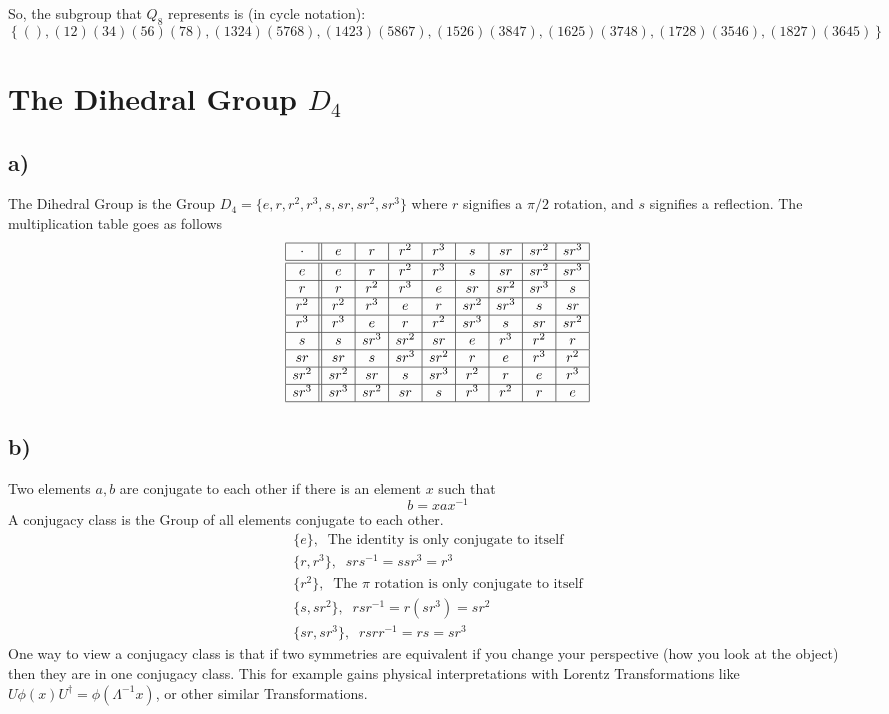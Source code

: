 \documentclass[]{scrartcl}
\begin{document}
So, the subgroup that $Q_8$ represents is (in cycle notation):
$$
\left\{(), (12)(34)(56)(78), (1324)(5768), (1423)(5867), (1526)(3847), (1625)(3748), (1728)(3546), (1827)(3645)\right\}
$$

\section{The Dihedral Group $D_4$}

\subsection{a)}
The Dihedral Group is the Group $D_4 = \{e,r,r^2,r^3,s,sr,sr^2,sr^3\}$ where $r$ signifies a $\pi/2$ rotation, and $s$ signifies a reflection. The multiplication table goes as follows
$$
\begin{array}{|c||c|c|c|c|c|c|c|c|}\hline
    \cdot & e & r & r^2 & r^3 & s & sr & sr^2 & sr^3 \\
    \hline\hline
    e & e & r & r^2 & r^3 & s & sr & sr^2 & sr^3 \\\hline
    r & r & r^2 & r^3 & e & sr & sr^2 & sr^3 & s \\\hline
    r^2 & r^2 & r^3 & e & r & sr^2 & sr^3 & s & sr \\\hline
    r^3 & r^3 & e & r & r^2 & sr^3 & s & sr & sr^2 \\\hline
    s & s & sr^3 & sr^2 & sr & e & r^3 & r^2 & r \\\hline
    sr & sr & s & sr^3 & sr^2 & r & e & r^3 & r^2 \\\hline
    sr^2 & sr^2 & sr & s & sr^3 & r^2 & r & e & r^3 \\\hline
    sr^3 & sr^3 & sr^2 & sr & s & r^3 & r^2 & r & e \\\hline
\end{array}
$$

\subsection{b)}

Two elements $a,b$ are conjugate to each other if there is an element $x$ such that
$$
b = xax^{-1}
$$
A conjugacy class is the Group of all elements conjugate to each other.
\begin{gather}
	\{e\},\;\;\text{The identity is only conjugate to itself}\nonumber\\
	\{r,r^3\},\;\; s r s^{-1} = s s r^3 = r^3\nonumber\\
	\{r^2\},\;\; \text{The $\pi$ rotation is only conjugate to itself}\nonumber\\
	\{s, sr^2\},\;\; r s r^{-1} = r (sr^3) = sr^2\nonumber\\
	\{sr, sr^3\},\;\; r sr r^{-1} = r s = sr^3\nonumber
\end{gather}
One way to view a conjugacy class is that if two symmetries are equivalent if you change your perspective (how you look at the object) then they are in one conjugacy class. This for example gains physical interpretations with Lorentz Transformations like $U \phi(x) U^\dagger = \phi(\Lambda^{-1}x)$, or other similar Transformations.
\end{document}
